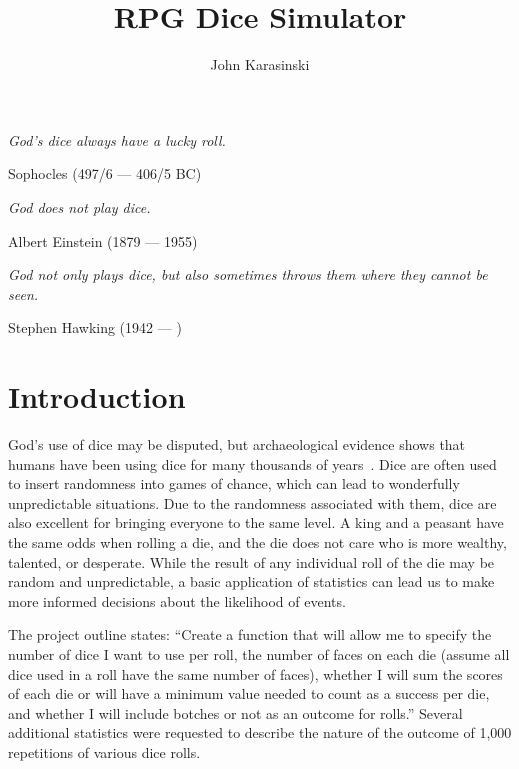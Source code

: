 \documentclass{article}
\begin{document}
\title{RPG Dice Simulator}
\author{John Karasinski}
\date{}

\setlength{\droptitle}{-5em}   %
\maketitle

\thispagestyle{plain}
\pagestyle{plain}

\vspace{-1.5cm}
\epigraph{\small\itshape God's dice always have a lucky roll.}{Sophocles (497/6 --- 406/5 BC)}%
\vspace{-2em}
\epigraph{\small\itshape God does not play dice.}{Albert Einstein (1879 --- 1955)}%
\vspace{-2em}
\epigraph{\small\itshape God not only plays dice, but also sometimes throws them where they cannot be seen.}{Stephen Hawking (1942 --- \hspace{1.5em})}%

\vspace{-1.0cm}
\section{Introduction}
God's use of dice may be disputed, but archaeological evidence shows that humans have been using dice for many thousands of years~\cite{history}. Dice are often used to insert randomness into games of chance, which can lead to wonderfully unpredictable situations. Due to the randomness associated with them, dice are also excellent for bringing everyone to the same level. A king and a peasant have the same odds when rolling a die, and the die does not care who is more wealthy, talented, or desperate. While the result of any individual roll of the die may be random and unpredictable, a basic application of statistics can lead us to make more informed decisions about the likelihood of events.

The project outline states: ``Create a function that will allow me to specify the number of dice I want to use per roll, the number of faces on each die (assume all dice used in a roll have the same number of faces), whether I will sum the scores of each die or will have a minimum value needed to count as a success per die, and whether I will include botches or not as an outcome for rolls.'' Several additional statistics were requested to describe the nature of the outcome of 1,000 repetitions of various dice rolls.
\end{document}
